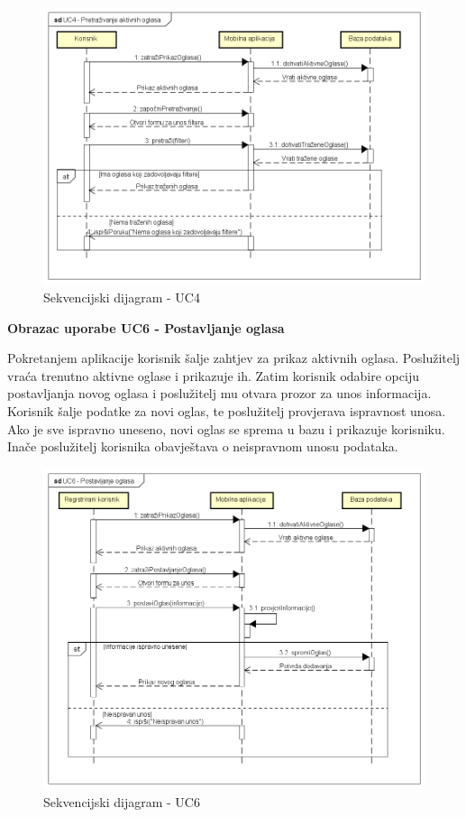 					\begin{figure}[H]
						\includegraphics[scale=0.65]{dijagrami/sekvencijskiDijagrami/sd4} %
						\centering
						\caption{Sekvencijski dijagram - UC4}
						\label{fig:sDijagram4}
					\end{figure}

				\textbf{Obrazac uporabe UC6 - Postavljanje oglasa}

				Pokretanjem aplikacije korisnik šalje zahtjev za prikaz aktivnih oglasa. Poslužitelj vraća trenutno aktivne oglase i prikazuje ih. Zatim korisnik odabire opciju postavljanja novog oglasa i poslužitelj mu otvara prozor za unos informacija. Korisnik šalje podatke za novi oglas, te poslužitelj provjerava ispravnost unosa. Ako je sve ispravno uneseno, novi oglas se sprema u bazu i prikazuje korisniku. Inače poslužitelj korisnika obavještava o neispravnom unosu podataka.

					\begin{figure}[H]
						\includegraphics[scale=0.65]{dijagrami/sekvencijskiDijagrami/sd6} %
						\centering
						\caption{Sekvencijski dijagram - UC6}
						\label{fig:sDijagram6}
					\end{figure}

